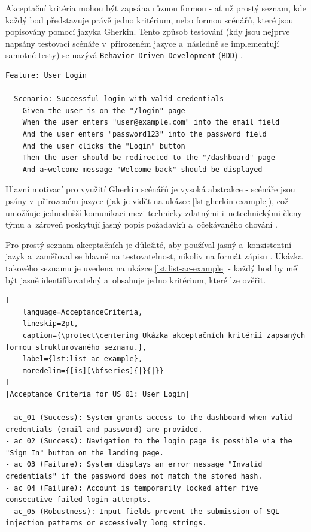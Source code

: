 \documentclass[czech, ing, kiv, he, iso690numb, viewonly]{fasthesis}
\begin{document}
 Akceptační kritéria mohou být zapsána různou formou - ať už prostý seznam, kde každý bod představuje právě jedno kritérium, 
 nebo formou scénářů, které jsou popisovány pomocí jazyka Gherkin. Tento způsob testování (kdy jsou nejprve napsány testovací 
 scénáře v~přirozeném jazyce a~následně se implementují samotné testy) se nazývá \texttt{Behavior-Driven Development} (\texttt{BDD}) \cite{9825769gherkin}.
 
\begin{lstlisting}[language=Gherkin, caption={\protect\centering Ukázka testovacího scénáře zapsaného pomocí klíčových slov jazyka Gherkin.}, label={lst:gherkin-example}]
Feature: User Login

  Scenario: Successful login with valid credentials
    Given the user is on the "/login" page
    When the user enters "user@example.com" into the email field
    And the user enters "password123" into the password field
    And the user clicks the "Login" button
    Then the user should be redirected to the "/dashboard" page
    And a~welcome message "Welcome back" should be displayed
\end{lstlisting}

Hlavní motivací pro využití Gherkin scénářů je vysoká abstrakce - scénáře jsou psány v~přirozeném jazyce (jak je vidět na ukázce \ref{lst:gherkin-example}), což umožňuje 
jednodušší komunikaci mezi technicky zdatnými i~netechnickými členy týmu a~zároveň poskytují jasný popis požadavků a~očekávaného chování \cite{alshammari2025use}.

Pro prostý seznam akceptačních je důležité, aby používal jasný a~konzistentní jazyk a~zaměřoval se hlavně na testovatelnost, nikoliv na formát zápisu \cite{ferreira2022towards}.
Ukázka takového seznamu je uvedena na ukázce \ref{lst:list-ac-example} - každý bod by měl být jasně identifikovatelný a~obsahuje jedno kritérium, které lze ověřit.

\begin{center}
\begin{minipage}{\textwidth}
\begin{lstlisting}[
    language=AcceptanceCriteria, 
    lineskip=2pt, 
    caption={\protect\centering Ukázka akceptačních kritérií zapsaných formou strukturovaného seznamu.}, 
    label={lst:list-ac-example},
    moredelim={[is][\bfseries]{|}{|}} 
]
|Acceptance Criteria for US_01: User Login|

- ac_01 (Success): System grants access to the dashboard when valid credentials (email and password) are provided.
- ac_02 (Success): Navigation to the login page is possible via the "Sign In" button on the landing page.
- ac_03 (Failure): System displays an error message "Invalid credentials" if the password does not match the stored hash.
- ac_04 (Failure): Account is temporarily locked after five consecutive failed login attempts.
- ac_05 (Robustness): Input fields prevent the submission of SQL injection patterns or excessively long strings.
\end{lstlisting}
\end{minipage}
\end{center}
\end{document}
